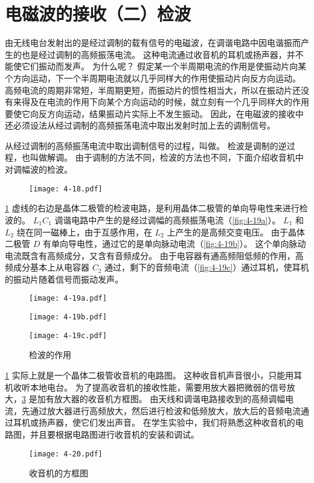 \section{电磁波的接收（二）\texorpdfstring{\quad}{ }检波}
由无线电台发射出的是经过调制的载有信号的电磁波，在调谐电路中因电谐振而产生的也是经过调制的高频振荡电流。
这种电流通过收音机的耳机或扬声器，并不能使它们振动而发声。
为什么呢？
假定某一个半周期电流的作用是使振动片向某个方向运动，下一个半周期电流就以几乎同样大的作用使振动片向反方向运动。
高频电流的周期非常短，半周期更短，而振动片的惯性相当大，所以在振动片还没有来得及在电流的作用下向某个方向运动的时候，就立刻有一个几乎同样大的作用要使它向反方向运动，结果振动片实际上不发生振动。
因此，在电磁波的接收中还必须设法从经过调制的高频振荡电流中取出发射时加上去的调制信号。

从经过调制的高频振荡电流中取出调制信号的过程，叫做。
检波是调制的逆过程，也叫做解调。
由于调制的方法不同，检波的方法也不同，下面介绍收音机中对调幅波的检波。
\begin{figure}
	\texttt{[image: 4-18.pdf]}
	\caption{}\label{fig:4-18}
\end{figure}

\cref{fig:4-18} 虚线的右边是晶体二极管的检波电路，是利用晶体二极管的单向导电性来进行检波的。
$L_1C_1$ 调谐电路中产生的是经过调幅的高频振荡电流（\cref{fig:4-19a}）。
$L_1$ 和 $L_2$ 绕在同一磁棒上，由于互感作用，在 $L_2$ 上产生的是高频交变电压。
由于晶体二极管 $D$ 有单向导电性，通过它的是单向脉动电流（\cref{fig:4-19b}）。
这个单向脉动电流既含有高频成分，又含有音频成分。
由于电容器有通高频阻低频的作用，高频成分基本上从电容器 $C_2$ 通过，剩下的音频电流（\cref{fig:4-19c}）通过耳机，使耳机的振动片随着信号而振动发声。
\begin{figure}
\begin{minipage}{\linewidth}\centering
	\texttt{[image: 4-19a.pdf]}
	\label{fig:4-19a}
\end{minipage}
\begin{minipage}{\linewidth}\centering
	\texttt{[image: 4-19b.pdf]}
	\label{fig:4-19b}
\end{minipage}
\begin{minipage}{\linewidth}\centering
	\texttt{[image: 4-19c.pdf]}
	\label{fig:4-19c}
\end{minipage}
\caption{检波的作用}\label{fig:4-19}
\end{figure}

\cref{fig:4-18} 实际上就是一个晶体二极管收音机的电路图。
这种收音机声音很小，只能用耳机收听本地电台。
为了提高收音机的接收性能，需要用放大器把微弱的信号放大，\cref{fig:4-20} 是加有放大器的收音机方框图。
由天线和调谐电路接收到的高频调幅电流，先通过放大器进行高频放大，然后进行检波和低频放大，放大后的音频电流通过耳机或扬声器，使它们发出声音。
在学生实验中，我们将熟悉这种收音机的电路图，并且要根据电路图进行收音机的安装和调试。
\begin{figure}
	\texttt{[image: 4-20.pdf]}
	\caption{收音机的方框图}\label{fig:4-20}
\end{figure}


